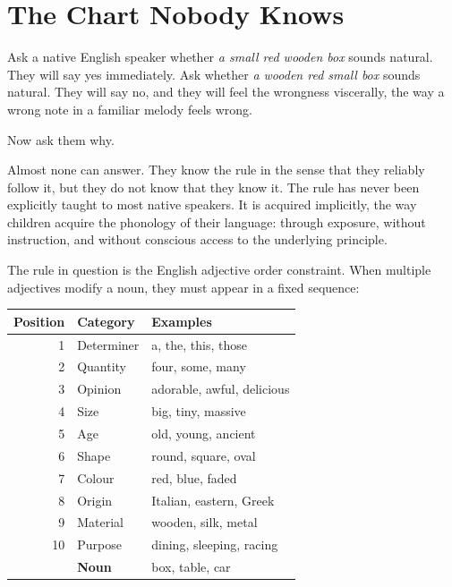 \documentclass[11pt]{article}
\theoremstyle{rthm}
\theoremstyle{rdef}
\theoremstyle{remark}
\begin{document}
\newpage
\setcounter{page}{1}

\section{The Chart Nobody Knows}
\label{sec:chart}

Ask a native English speaker whether \emph{a small red wooden box} sounds
natural. They will say yes immediately. Ask whether \emph{a wooden red small
box} sounds natural. They will say no, and they will feel the wrongness
viscerally, the way a wrong note in a familiar melody feels wrong.

Now ask them why.

Almost none can answer. They know the rule in the sense that they reliably
follow it, but they do not know that they know it. The rule has never been
explicitly taught to most native speakers. It is acquired implicitly, the way
children acquire the phonology of their language: through exposure, without
instruction, and without conscious access to the underlying principle.

The rule in question is the English adjective order constraint. When multiple
adjectives modify a noun, they must appear in a fixed sequence:

\medskip
\begin{center}
\renewcommand{\arraystretch}{1.3}
\begin{tabular}{r l l}
\toprule
\textbf{Position} & \textbf{Category} & \textbf{Examples} \\
\midrule
1 & Determiner   & a, the, this, those \\
2 & Quantity     & four, some, many \\
3 & Opinion      & adorable, awful, delicious \\
4 & Size         & big, tiny, massive \\
5 & Age          & old, young, ancient \\
6 & Shape        & round, square, oval \\
7 & Colour       & red, blue, faded \\
8 & Origin       & Italian, eastern, Greek \\
9 & Material     & wooden, silk, metal \\
10 & Purpose     & dining, sleeping, racing \\
  & \textbf{Noun} & box, table, car \\
\bottomrule
\end{tabular}
\end{center}
\medskip
\end{document}
